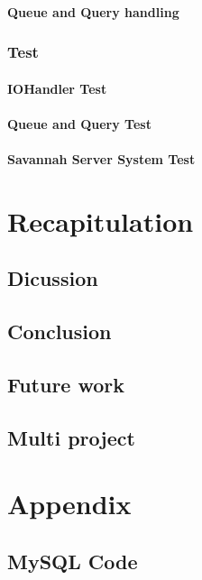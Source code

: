       \subsubsection{Queue and Query handling} %
	\label{QQHandling}
	  
    \subsection{Test}
      
      \subsubsection{IOHandler Test}
      
      \subsubsection{Queue and Query Test}
      
      \subsubsection{Savannah Server System Test}
      

\chapter{Recapitulation}
\label{recap}
  \section{Dicussion}
    
  \section{Conclusion}
    
  \section{Future work}
  \section{Multi project} %

\appendix
    \chapter{Appendix}
    \section{MySQL Code}
    \label{MySQLcode}
      
